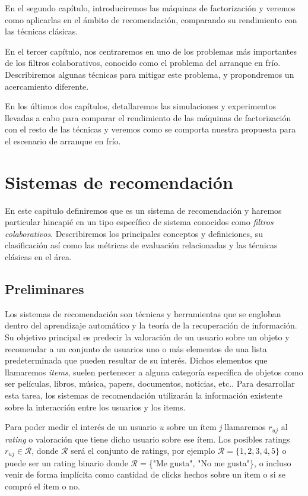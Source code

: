 \documentclass[hidelinks,12pt,a4paper]{book}
\theoremstyle{plain}
\theoremstyle{definition}
\begin{document}
En el segundo capítulo, introduciremos las máquinas de factorización y veremos como aplicarlas en el ámbito de recomendación, comparando su rendimiento con las técnicas clásicas.

En el tercer capítulo, nos centraremos en uno de los problemas más importantes de los filtros colaborativos, conocido como el problema del arranque en frío. Describiremos algunas técnicas para mitigar este problema, y propondremos un acercamiento diferente.

En los últimos dos capítulos, detallaremos las simulaciones y experimentos llevadas a cabo para comparar el rendimiento de las máquinas de factorización con el resto de las técnicas y veremos como se comporta nuestra propuesta para el escenario de arranque en frío.

\chapter{Sistemas de recomendación}

En este capitulo definiremos que es un sistema de recomendación y haremos particular hincapié en un tipo específico de sistema conocidos como \textit{filtros colaborativos}. Describiremos los principales conceptos y definiciones, su clasificación así como las métricas de evaluación relacionadas y las técnicas clásicas en el área.

\section{Preliminares}

Los sistemas de recomendación son técnicas y herramientas que se engloban dentro del aprendizaje automático y la teoría de la recuperación de información. Su objetivo principal es predecir la valoración de un usuario sobre un objeto y recomendar a un conjunto de usuarios uno o más elementos de una lista predeterminada que pueden resultar de su interés. Dichos elementos que llamaremos \textit{items}, suelen pertenecer a alguna categoría específica de objetos como ser películas, libros, música, papers, documentos, noticias, etc.\cite{agg}. Para desarrollar esta tarea, los sistemas de recomendación utilizarán la información existente sobre la interacción entre los usuarios y los items.

Para poder medir el interés de un usuario \textit{u} sobre un ítem \textit{j} llamaremos $r_{uj}$ al \textit{rating} o valoración que tiene dicho usuario sobre ese ítem. Los posibles ratings $r_{uj}\in \mathcal{R}$, donde $\mathcal{R}$ será el conjunto de ratings, por ejemplo $\mathcal{R}=\{1,2,3,4,5\}$ o puede ser un rating binario donde $\mathcal{R}=$\{"Me gusta", "No me gusta"\}, o incluso venir de forma implícita como cantidad de clicks hechos sobre un ítem o si se compró el ítem o no. 
\end{document}
